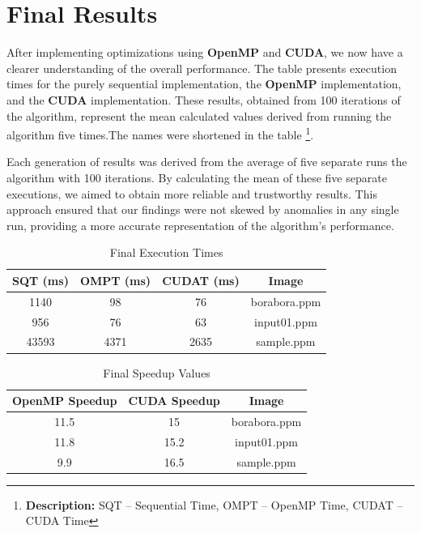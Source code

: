 \documentclass[sigconf]{acmart}
\begin{document}
\section{Final Results}
After implementing optimizations using \textbf{OpenMP} and \textbf{CUDA}, we now have a clearer understanding of the overall performance. The table presents execution times for the purely sequential implementation, the \textbf{OpenMP} implementation, and the \textbf{CUDA} implementation. These results, obtained from 100 iterations of the algorithm, represent the mean calculated values derived from running the algorithm five times.The names were shortened in the table \footnote{\textbf{Description:} SQT -- Sequential Time, OMPT -- OpenMP Time, CUDAT -- CUDA Time}.

Each generation of results was derived from the average of five separate runs the algorithm with 100 iterations. By calculating the mean of these five separate executions, we aimed to obtain more reliable and trustworthy results. This approach ensured that our findings were not skewed by anomalies in any single run, providing a more accurate representation of the algorithm's performance.

\begin{table}[h!]
\centering
\begin{tabular}{|c|c|c|c|}
\hline
\textbf{SQT (ms)} & \textbf{OMPT (ms)} & \textbf{CUDAT (ms)} & \textbf{Image} \\
\hline
1140 & 98 & 76 & borabora.ppm \\
\hline
956 & 76 & 63 & input01.ppm \\
\hline
43593 & 4371 & 2635 & sample.ppm \\
\hline
\end{tabular}
\vspace{0.2cm} %
\caption{Final Execution Times}
\label{table:final}
\end{table}

\begin{table}[h!]
\centering
\begin{tabular}{|c|c|c|}
\hline
\textbf{OpenMP Speedup} & \textbf{CUDA Speedup} & \textbf{Image} \\
\hline
11.5 & 15 & borabora.ppm \\
\hline
11.8 & 15.2 & input01.ppm \\
\hline
9.9 & 16.5 & sample.ppm \\
\hline
\end{tabular}
\vspace{0.2cm} %
\caption{Final Speedup Values}
\label{table:speeds}
\end{table}
\end{document}
